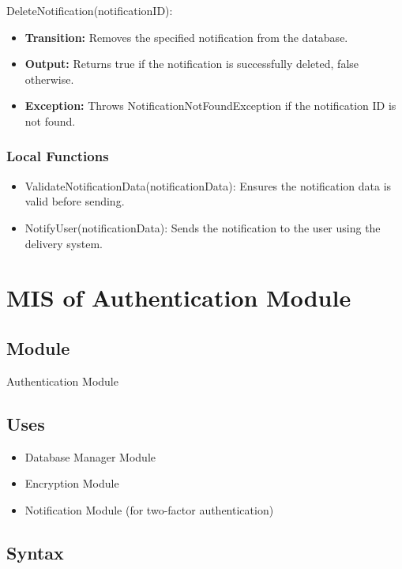 \documentclass[12pt, titlepage]{article}
\begin{document}
\noindent DeleteNotification(notificationID):
\begin{itemize}
  \item \textbf{Transition:} Removes the specified notification from the database.
  \item \textbf{Output:} Returns true if the notification is successfully deleted, false otherwise.
  \item \textbf{Exception:} Throws NotificationNotFoundException if the notification ID is not found.
\end{itemize}

\subsubsection{Local Functions}

\begin{itemize}
  \item ValidateNotificationData(notificationData): Ensures the notification data is valid before sending.
  \item NotifyUser(notificationData): Sends the notification to the user using the delivery system.
\end{itemize}

\newpage

\section{MIS of Authentication Module} \label{Module_Authentication}

\subsection{Module}

Authentication Module

\subsection{Uses}

\begin{itemize}
  \item Database Manager Module
  \item Encryption Module
  \item Notification Module (for two-factor authentication)
\end{itemize}

\subsection{Syntax}
\end{document}
